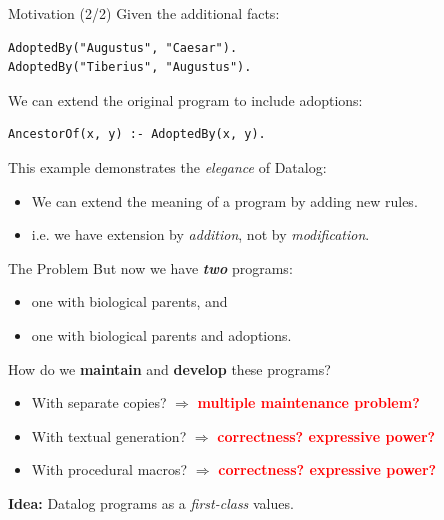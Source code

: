 \begin{frame}[fragile]{Motivation (2/2)}
Given the additional facts:

\begin{lstlisting}[language=flix, xleftmargin=0.8cm]
AdoptedBy("Augustus", "Caesar").
AdoptedBy("Tiberius", "Augustus").
\end{lstlisting}

We can extend the original program to include adoptions:

\begin{lstlisting}[language=flix, xleftmargin=0.8cm]
AncestorOf(x, y) :- AdoptedBy(x, y).
\end{lstlisting}

\pause

This example demonstrates the \emph{elegance} of Datalog:

\begin{itemize}
    \item We can extend the meaning of a program by adding new rules.
    \item i.e. we have extension by \emph{addition}, not by \emph{modification}.
\end{itemize}
\end{frame}

\begin{frame}{The Problem}
But now we have \textbf{\emph{two}} programs: 

\begin{itemize}
    \item one with biological parents, and
    \item one with biological parents and adoptions.
\end{itemize}

\pause

How do we \textbf{maintain} and \textbf{develop} these programs?

\begin{itemize}
    \pause \item With separate copies? $\Rightarrow$ \textcolor{red}{\bfseries multiple maintenance problem?}
    \pause \item With textual generation? $\Rightarrow$ \textcolor{red}{\bfseries correctness? expressive power?}
    \pause \item With procedural macros? $\Rightarrow$ \textcolor{red}{\bfseries correctness? expressive power?}
\end{itemize}

\pause

\begin{center}
\large
\textbf{Idea:} Datalog programs as a \emph{first-class} values.
\end{center}
\end{frame}

